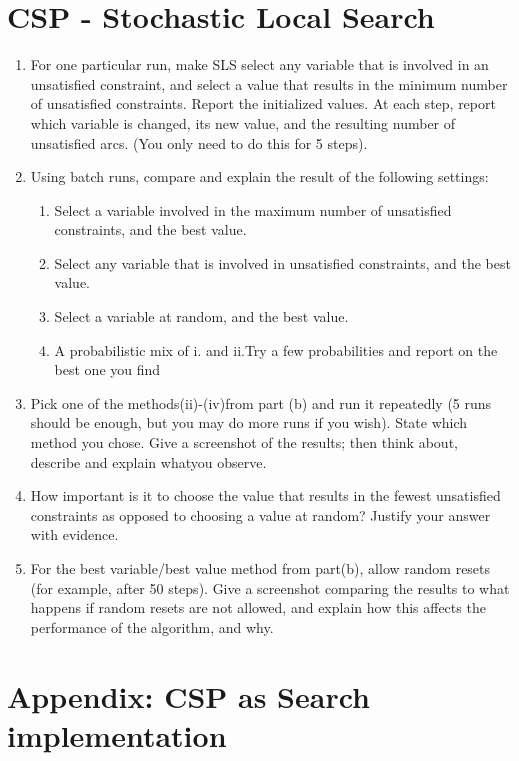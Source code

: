 \documentclass{article}
\def\ans#1{{\color{ans}#1}}
\begin{document}
\section{CSP - Stochastic Local Search}
\begin{enumerate}[label=(\alph*)]
    \item For one particular run, make SLS select any variable that is involved in an unsatisfied constraint, and select a value that results in the minimum number of unsatisfied constraints. Report the initialized values.  At each step, report which variable is changed, its new value, and the resulting number of unsatisfied arcs. (You only need to do this for 5 steps).
    \ans{
    }
    \item Using batch runs, compare and explain the result of the following settings:
    \begin{enumerate}[label=(\roman*)]
        \item Select a variable involved in the maximum number of unsatisfied constraints, and the best value.
        \ans{
        }
        \item Select any variable that is involved in unsatisfied constraints, and the best value.
        \ans{
        }
        \item Select a variable at random, and the best value.
        \ans{
        }
        \item A probabilistic mix of i. and ii.Try a few probabilities and report on the best one you find
        \ans{
        }
    \end{enumerate}
    \item Pick one of the methods(ii)-(iv)from part (b) and run it repeatedly (5 runs should be enough, but you may do more runs if you wish). State which method you chose. Give a screenshot of the results; then think about, describe and explain whatyou observe.
    \ans{
    }
    \item How important is it to choose the value that results in the fewest unsatisfied constraints as opposed to choosing a value at random? Justify your answer with evidence.
    \ans{
    }
    \item For the best variable/best value method from part(b), allow random resets (for example, after 50 steps). Give a screenshot comparing the results to what happens if random resets are not allowed, and explain how this affects the performance of the algorithm, and why.
    \ans{
    }
\end{enumerate}

\clearpage
\appendix

\section{Appendix: CSP as Search implementation}
\label{appendix:CSP Search}
\begin{center}
    
\end{center}
\end{document}
